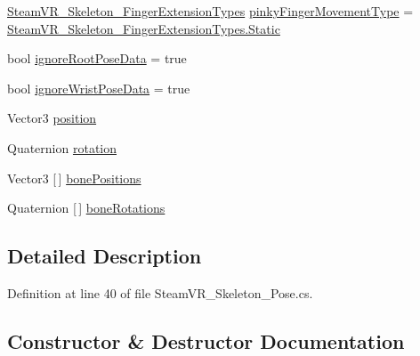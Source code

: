 \begin{DoxyCompactItemize}
\mbox{\hyperlink{namespace_valve_1_1_v_r_af4f7ce87893374f71b2fa2ba112642da}{Steam\+V\+R\+\_\+\+Skeleton\+\_\+\+Finger\+Extension\+Types}} \mbox{\hyperlink{class_valve_1_1_v_r_1_1_steam_v_r___skeleton___pose___hand_aa2693526977ec3902da52cd4af6f269b}{pinky\+Finger\+Movement\+Type}} = \mbox{\hyperlink{namespace_valve_1_1_v_r_af4f7ce87893374f71b2fa2ba112642daa84a8921b25f505d0d2077aeb5db4bc16}{Steam\+V\+R\+\_\+\+Skeleton\+\_\+\+Finger\+Extension\+Types.\+Static}}
\item 
bool \mbox{\hyperlink{class_valve_1_1_v_r_1_1_steam_v_r___skeleton___pose___hand_ac60420dbb7dcac32b2ee39cf31dcefc1}{ignore\+Root\+Pose\+Data}} = true
\item 
bool \mbox{\hyperlink{class_valve_1_1_v_r_1_1_steam_v_r___skeleton___pose___hand_a113340976c2530ba566cff79a9fdbe51}{ignore\+Wrist\+Pose\+Data}} = true
\item 
Vector3 \mbox{\hyperlink{class_valve_1_1_v_r_1_1_steam_v_r___skeleton___pose___hand_a1621152dc8469b2e9ba09535f2c0ad28}{position}}
\item 
Quaternion \mbox{\hyperlink{class_valve_1_1_v_r_1_1_steam_v_r___skeleton___pose___hand_a08578472e61f788eb40dc2c7f0e9d533}{rotation}}
\item 
Vector3 \mbox{[}$\,$\mbox{]} \mbox{\hyperlink{class_valve_1_1_v_r_1_1_steam_v_r___skeleton___pose___hand_abee51a185db7159e978f6e56ca2f4d06}{bone\+Positions}}
\item 
Quaternion \mbox{[}$\,$\mbox{]} \mbox{\hyperlink{class_valve_1_1_v_r_1_1_steam_v_r___skeleton___pose___hand_a393bd313dfb94bf28b1619685dd384c9}{bone\+Rotations}}
\end{DoxyCompactItemize}


\subsection{Detailed Description}


Definition at line 40 of file Steam\+V\+R\+\_\+\+Skeleton\+\_\+\+Pose.\+cs.



\subsection{Constructor \& Destructor Documentation}
\mbox{\label{class_valve_1_1_v_r_1_1_steam_v_r___skeleton___pose___hand_a45dbb8c35c911f7df189ebf1dbb6b443}} 
